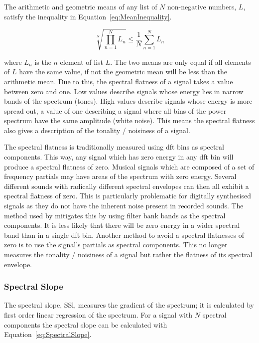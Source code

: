 			The arithmetic and geometric means of any list of $N$ non-negative numbers, $L$, satisfy the
			inequality in Equation~\ref{eq:MeanInequality}.

			\begin{equation}
				\sqrt[N]{\prod_{n = 1}^{N} L_{n}} \leq \frac{1}{N} \sum_{n = 1}^{N} L_{n}
				\label{eq:MeanInequality}
			\end{equation}

			where $L_{n}$ is the $n$ element of list $L$. The two means are only equal if all
			elements of $L$ have the same value, if not the geometric mean will be less than the arithmetic
			mean. Due to this, the spectral flatness of a signal takes a value between zero and one. Low values
			describe signals whose energy lies in narrow bands of the spectrum (tones). High values describe
			signals whose energy is more spread out, a value of one describing a signal where all bins of the
			power spectrum have the same amplitude (white noise). This means the spectral flatness also gives a
			description of the tonality / noisiness of a signal.

			The spectral flatness is traditionally measured using \acrshort{dft} bins as spectral components.
			This way, any signal which has zero energy in any \acrshort{dft} bin will produce a spectral
			flatness of zero. Musical signals which are composed of a set of frequency partials may have areas
			of the spectrum with zero energy. Several different sounds with radically different spectral
			envelopes can then all exhibit a spectral flatness of zero. This is particularly problematic for
			digitally synthesised signals as they do not have the inherent noise present in recorded sounds.
			The method used by \citet{peeters2004a} mitigates this by using filter bank bands as the spectral
			components. It is less likely that there will be zero energy in a wider spectral band than in a
			single \acrshort{dft} bin. Another method to avoid a spectral flatnesses of zero is to use the
			signal's partials as spectral components.  This no longer measures the tonality / noisiness of a
			signal but rather the flatness of its spectral envelope.

		\subsubsection*{Spectral Slope}
			The spectral slope, $\mathrm{SSl}$, measures the gradient of the spectrum; it is calculated by
			first order linear regression of the spectrum. For a signal with $N$ spectral components the
			spectral slope can be calculated with Equation~\ref{eq:SpectralSlope}.

